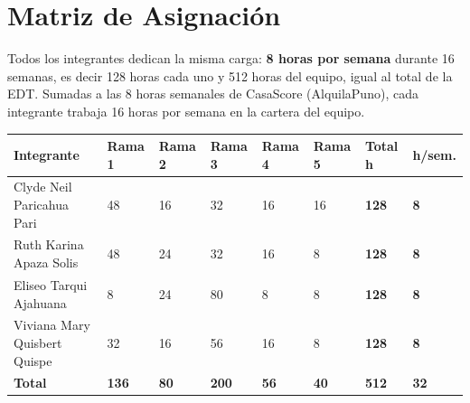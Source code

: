 \documentclass[11pt,a4paper]{article}
\begin{document}
\section{Matriz de Asignación}
Todos los integrantes dedican la misma carga: \textbf{8 horas por semana} durante 16 semanas, es decir 128 horas cada uno y 512 horas del equipo, igual al total de la EDT. Sumadas a las 8 horas semanales de CasaScore (AlquilaPuno), cada integrante trabaja 16 horas por semana en la cartera del equipo.

\vspace{0.1cm}
{\small
\setlength{\tabcolsep}{4pt}
\noindent\begin{tabularx}{\textwidth}{@{}L C{1.0cm} C{1.0cm} C{1.0cm} C{1.0cm} C{1.0cm} C{1.1cm} C{1.1cm}@{}}
\toprule
{}
\textbf{Integrante} & \textcolor{Rama1}{\textbf{Rama 1}} & \textcolor{Rama2}{\textbf{Rama 2}} & \textcolor{Rama3}{\textbf{Rama 3}} & \textcolor{Rama4}{\textbf{Rama 4}} & \textcolor{Rama5}{\textbf{Rama 5}} & \textbf{Total h} & \textbf{h/sem.} \\
\midrule
Clyde Neil Paricahua Pari & 48 & 16 & 32 & 16 & 16 & \textbf{128} & \textbf{8} \\
Ruth Karina Apaza Solis & 48 & 24 & 32 & 16 & 8 & \textbf{128} & \textbf{8} \\
Eliseo Tarqui Ajahuana & 8 & 24 & 80 & 8 & 8 & \textbf{128} & \textbf{8} \\
Viviana Mary Quisbert Quispe & 32 & 16 & 56 & 16 & 8 & \textbf{128} & \textbf{8} \\
\midrule
\textbf{Total} & \textbf{136} & \textbf{80} & \textbf{200} & \textbf{56} & \textbf{40} & \textbf{512} & \textbf{32} \\
\bottomrule
\end{tabularx}
}
\end{document}
